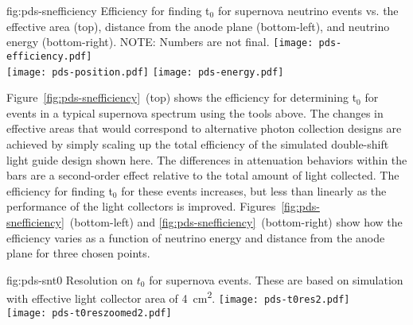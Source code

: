 \begin{dunefigure}{fig:pds-snefficiency}
{Efficiency for finding t$_0$ for supernova neutrino events vs. the effective area (top), distance from the anode plane (bottom-left), and neutrino energy (bottom-right). NOTE: Numbers are not final.}
  \texttt{[image: pds-efficiency.pdf]}\\
  \texttt{[image: pds-position.pdf]}
  \texttt{[image: pds-energy.pdf]}
\end{dunefigure}

Figure~\ref{fig:pds-snefficiency}~(top) shows the efficiency for determining t$_0$ for events in a typical supernova spectrum using the tools above. The changes in effective areas that would correspond to alternative photon collection designs are achieved by simply scaling up the total efficiency of the simulated double-shift light guide design shown here. The differences in attenuation behaviors within the bars are a second-order effect relative to the total amount of light collected. The efficiency for finding t$_0$ for these events increases, but less than linearly as the performance of the light collectors is improved. Figures~\ref{fig:pds-snefficiency}~(bottom-left) and \ref{fig:pds-snefficiency}~(bottom-right) show how the efficiency varies as a function of neutrino energy and distance from the anode plane for three chosen points.

\begin{dunefigure}{fig:pds-snt0}
{Resolution on $t_0$ for supernova events. These are based on simulation with effective light collector area of \SI{4}{cm^2}.}
  \texttt{[image: pds-t0res2.pdf]}\\
  \texttt{[image: pds-t0reszoomed2.pdf]}
\end{dunefigure}

